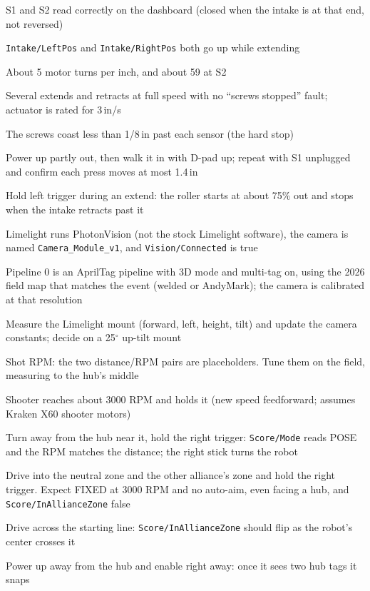\documentclass[11pt]{article}
\newcommand{\dash}[1]{\texttt{#1}}
\begin{document}
\begin{checklist}
  \item S1 and S2 read correctly on the dashboard (closed when the intake is at that end, not
    reversed)
  \item \dash{Intake/LeftPos} and \dash{Intake/RightPos} both go up while extending
  \item About 5 motor turns per inch, and about 59 at S2
  \item Several extends and retracts at full speed with no ``screws stopped'' fault; actuator is
    rated for 3\,in/s
  \item The screws coast less than 1/8\,in past each sensor (the hard stop)
  \item Power up partly out, then walk it in with D-pad up; repeat with S1 unplugged and confirm
    each press moves at most 1.4\,in
  \item Hold left trigger during an extend: the roller starts at about 75\% out and stops when
    the intake retracts past it
  \item Limelight runs PhotonVision (not the stock Limelight software), the camera is named
    \texttt{Camera\_\allowbreak Module\_\allowbreak v1}, and \dash{Vision/Connected} is true
  \item Pipeline 0 is an AprilTag pipeline with 3D mode and multi-tag on, using the 2026 field map
    that matches the event (welded or AndyMark); the camera is calibrated at that resolution
  \item Measure the Limelight mount (forward, left, height, tilt) and update the camera constants;
    decide on a 25$^\circ$ up-tilt mount
  \item Shot RPM: the two distance/RPM pairs are placeholders. Tune them on the field, measuring
    to the hub's middle
  \item Shooter reaches about 3000 RPM and holds it (new speed feedforward; assumes Kraken X60
    shooter motors)
  \item Turn away from the hub near it, hold the right trigger: \dash{Score/Mode} reads POSE and
    the RPM matches the distance; the right stick turns the robot
  \item Drive into the neutral zone and the other alliance's zone and hold the right trigger.
    Expect FIXED at 3000 RPM and no auto-aim, even facing a hub, and
    \dash{Score/InAllianceZone} false
  \item Drive across the starting line: \dash{Score/InAllianceZone} should flip as the robot's
    center crosses it
  \item Power up away from the hub and enable right away: once it sees two hub tags it snaps

\end{checklist}
\end{document}
